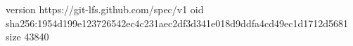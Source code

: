 version https://git-lfs.github.com/spec/v1
oid sha256:1954d199e123726542ec4c231aec2df3d341e018d9ddfa4cd49ec1d1712d5681
size 43840
